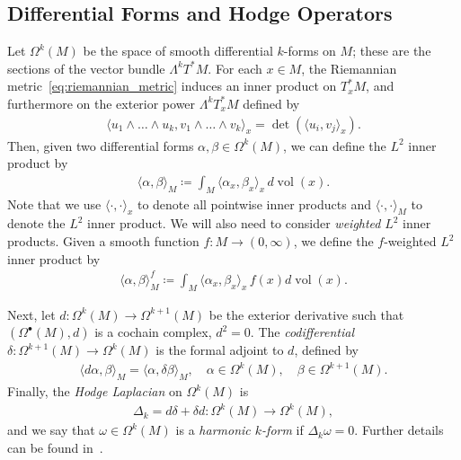 \documentclass[11pt,reqno]{amsproc}
\numberwithin{equation}{section}
\newcommand{\vol}{\operatorname{vol}}
\newcommand{\dvol}{d\!\vol}
\theoremstyle{definition}
\theoremstyle{plain}
\begin{document}
    \subsection{Differential Forms and Hodge Operators} \label{ssec:differential_forms}
    Let $\Omega^k(M)$ be the space of smooth differential $k$-forms on $M$; these are the sections of the vector bundle $\Lambda^k T^* M$. For each $x \in M$, the Riemannian metric~\eqref{eq:riemannian_metric} induces an inner product on $T^*_x M$, and furthermore on the exterior power $\Lambda^k T_x^* M$ defined by
    \begin{align}
        \langle u_1 \wedge \ldots \wedge u_k, v_1 \wedge \ldots \wedge v_k \rangle_x = \det( \langle u_i, v_j\rangle_x).
    \end{align}
    Then, given two differential forms $\alpha, \beta \in \Omega^k(M)$, we can define the $L^2$ inner product by
    \begin{align}
        \langle \alpha, \beta \rangle_M \coloneqq \int_M \langle \alpha_x, \beta_x \rangle_x \, \dvol(x).
    \end{align}
    Note that we use $\langle \cdot , \cdot \rangle_x$ to denote all pointwise inner products and $\langle \cdot , \cdot \rangle_M$ to denote the $L^2$ inner product. We will also need to consider \emph{weighted} $L^2$ inner products. Given a smooth function $f: M \to (0,\infty)$, we define the $f$-weighted $L^2$ inner product by
    \begin{align} \label{eq:weighted_L2}
        \langle \alpha, \beta \rangle_M^f \coloneqq \int_M \langle \alpha_x, \beta_x \rangle_x \, f(x) \dvol(x).
    \end{align}


    Next, let $d: \Omega^k(M) \to \Omega^{k+1}(M)$ be the exterior derivative such that $(\Omega^\bullet(M), d)$ is a cochain complex, $d^2 = 0$. The \emph{codifferential} $\delta: \Omega^{k+1}(M) \to \Omega^k(M)$ is the formal adjoint to $d$, defined by
    \begin{align} \label{eq:smooth_codifferential}
        \langle d\alpha, \beta \rangle_M = \langle \alpha, \delta \beta \rangle_M, \quad \alpha \in \Omega^k(M), \quad \beta \in \Omega^{k+1}(M). 
    \end{align}
    Finally, the \emph{Hodge Laplacian} on $\Omega^k(M)$ is
    \begin{align} \label{eq:smooth_laplacian}
        \Delta_k = d \delta + \delta d : \Omega^k(M) \to \Omega^k(M),
    \end{align}
    and we say that $\omega \in \Omega^k(M)$ is a \emph{harmonic $k$-form} if $\Delta_k \omega = 0$. Further details can be found in~\cite{jost_riemannian_2013}.
\end{document}
